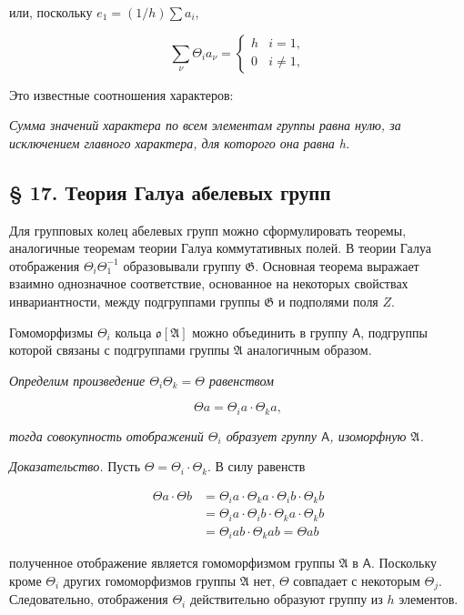 \documentclass[11pt]{article}
\begin{document}
или, поскольку \(e_1 = (1/h) \sum a_i\),

\[
\sum_\nu \Theta_i a_\nu=\begin{cases} h & i=1,\\ 0 & i\ne 1, \end{cases}
\]

Это известные соотношения характеров:

\emph{Сумма значений характера по всем элементам группы равна нулю, за исключением главного характера, для которого она равна h.}

\subsection*{§ 17. Теория Галуа абелевых групп}\label{die-galoissche-theorie-abelscher-gruppen}

Для групповых колец абелевых групп можно сформулировать теоремы, аналогичные теоремам теории Галуа коммутативных полей. В теории Галуа отображения \(\Theta_i\Theta_1^{-1}\) образовывали группу \(\mathfrak{G}\). Основная теорема выражает взаимно однозначное соответствие, основанное на некоторых свойствах инвариантности, между подгруппами группы \(\mathfrak{G}\) и подполями поля \(Z\).

Гомоморфизмы \(\Theta_i\) кольца \(\mathfrak{o}[\mathfrak{A}]\) можно объединить в группу \(\mathsf A\), подгруппы которой связаны с подгруппами группы \(\mathfrak{A}\) аналогичным образом.

\emph{Определим произведение \(\Theta_i \Theta_k = \Theta\) равенством}

\[\Theta a = \Theta_i a \cdot \Theta_k a,\]

\emph{тогда совокупность отображений \(\Theta_i\) образует группу \(\mathsf A\), изоморфную \(\mathfrak A\).}

\emph{Доказательство.} Пусть \(\Theta = \Theta_i \cdot \Theta_k\). В силу равенств

\[\begin{aligned}
\Theta a \cdot \Theta b &= \Theta_i a \cdot \Theta_k a \cdot \Theta_i b \cdot \Theta_k b \\
&= \Theta_i a \cdot \Theta_i b \cdot \Theta_k a \cdot \Theta_k b \\
&= \Theta_i a b \cdot \Theta_k a b = \Theta a b
\end{aligned}\]

полученное отображение является гомоморфизмом группы \(\mathfrak A\) в \(\mathsf A\). Поскольку кроме \(\Theta_i\) других гомоморфизмов группы \(\mathfrak A\) нет, \(\Theta\) совпадает с некоторым \(\Theta_j\). Следовательно, отображения \(\Theta_i\) действительно образуют группу из \(h\) элементов.
\end{document}
